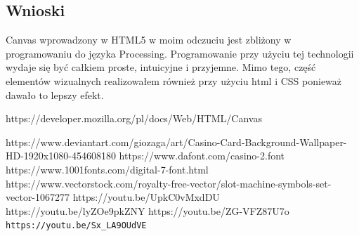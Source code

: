 \documentclass[a4paper,11pt,titlepage]{article}
\begin{document}
\subsection{Wnioski}
Canvas wprowadzony w HTML5 w moim odczuciu jest zbliżony w programowaniu do języka Processing. Programowanie przy użyciu tej technologii wydaje się być całkiem proste, intuicyjne i przyjemne. Mimo tego, część elementów wizualnych realizowałem również przy użyciu html i CSS ponieważ dawało to lepszy efekt.


\newpage
{}
\listoffigures
\newpage


\begin{thebibliography}{9}
https://developer.mozilla.org/pl/docs/Web/HTML/Canvas

https://www.deviantart.com/giozaga/art/Casino-Card-Background-Wallpaper-HD-1920x1080-454608180
https://www.dafont.com/casino-2.font
https://www.1001fonts.com/digital-7-font.html
https://www.vectorstock.com/royalty-free-vector/slot-machine-symbols-set-vector-1067277
https://youtu.be/UpkC0vMxdDU
https://youtu.be/lyZOe9pkZNY
https://youtu.be/ZG-VFZ87U7o
\verb|https://youtu.be/Sx_LA9OUdVE|


\end{thebibliography}
\end{document}
